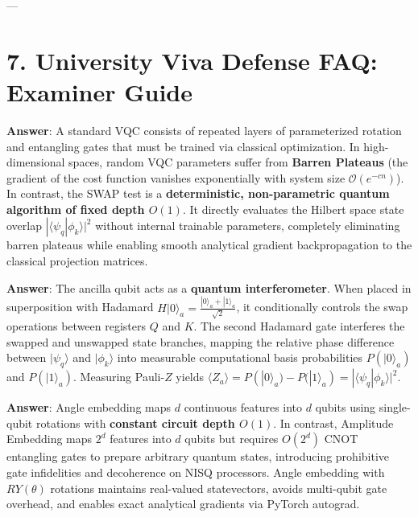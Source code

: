 \documentclass[11pt,a4paper]{article}
\begin{document}
---

\section{7. University Viva Defense FAQ: Examiner Guide}

\begin{tcolorbox}[colback=white,colframe=blue!60!black,title=\textbf{Q1: Why did you use the Quantum SWAP Test instead of a Variational Quantum Circuit (VQC)?}]
\textbf{Answer}: A standard VQC consists of repeated layers of parameterized rotation and entangling gates that must be trained via classical optimization. In high-dimensional spaces, random VQC parameters suffer from \textbf{Barren Plateaus} (the gradient of the cost function vanishes exponentially with system size $\mathcal{O}(e^{-c n})$). In contrast, the SWAP test is a \textbf{deterministic, non-parametric quantum algorithm of fixed depth $O(1)$}. It directly evaluates the Hilbert space state overlap $|\langle \psi_q | \phi_k \rangle|^2$ without internal trainable parameters, completely eliminating barren plateaus while enabling smooth analytical gradient backpropagation to the classical projection matrices.
\end{tcolorbox}

\begin{tcolorbox}[colback=white,colframe=blue!60!black,title=\textbf{Q2: What is the physical role of the Ancilla Qubit?}]
\textbf{Answer}: The ancilla qubit acts as a \textbf{quantum interferometer}. When placed in superposition with Hadamard $H|0\rangle_a = \frac{|0\rangle_a + |1\rangle_a}{\sqrt{2}}$, it conditionally controls the swap operations between registers $Q$ and $K$. The second Hadamard gate interferes the swapped and unswapped state branches, mapping the relative phase difference between $|\psi_q\rangle$ and $|\phi_k\rangle$ into measurable computational basis probabilities $P(|0\rangle_a)$ and $P(|1\rangle_a)$. Measuring Pauli-$Z$ yields $\langle Z_a \rangle = P(|0\rangle_a) - P(|1\rangle_a) = |\langle \psi_q | \phi_k \rangle|^2$.
\end{tcolorbox}

\begin{tcolorbox}[colback=white,colframe=blue!60!black,title=\textbf{Q3: Why did you choose Angle Embedding ($RY$ rotations)?}]
\textbf{Answer}: Angle embedding maps $d$ continuous features into $d$ qubits using single-qubit rotations with \textbf{constant circuit depth $O(1)$}. In contrast, Amplitude Embedding maps $2^d$ features into $d$ qubits but requires $O(2^d)$ CNOT entangling gates to prepare arbitrary quantum states, introducing prohibitive gate infidelities and decoherence on NISQ processors. Angle embedding with $RY(\theta)$ rotations maintains real-valued statevectors, avoids multi-qubit gate overhead, and enables exact analytical gradients via PyTorch autograd.
\end{tcolorbox}
\end{document}
